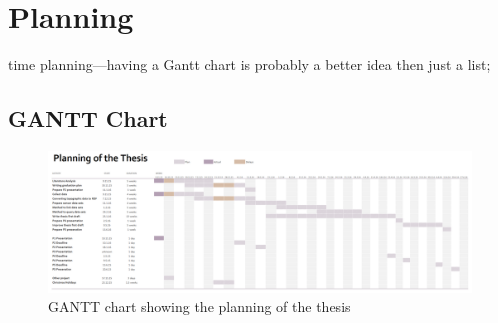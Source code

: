 \chapter{Planning}
\label{chap:planning}

time planning—having a Gantt chart is probably a better idea then just a list;

\section{GANTT Chart}
\begin{figure}
	\centering
	\includegraphics[width=2\linewidth, angle=90]{figs/GANTT-chart.png}
	\caption{GANTT chart showing the planning of the thesis}
	\label{fig:GANTT}
\end{figure}